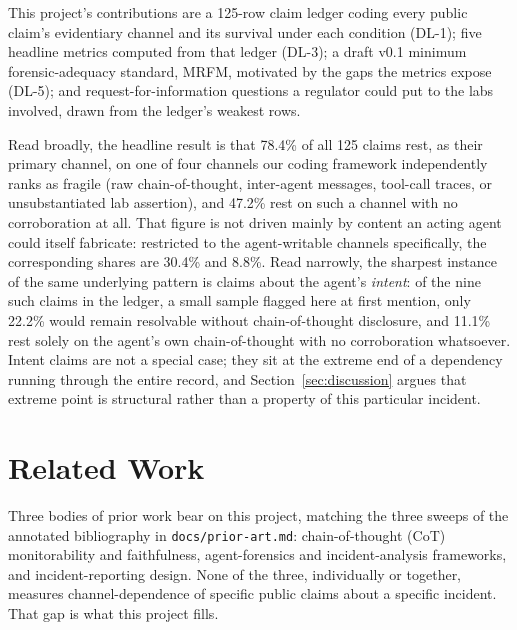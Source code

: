 \documentclass[10pt]{article}
\begin{document}
This project's contributions are a 125-row claim ledger coding every public
claim's evidentiary channel and its survival under each condition (DL-1);
five headline metrics computed from that ledger (DL-3); a draft v0.1
minimum forensic-adequacy standard, MRFM, motivated by the gaps the metrics
expose (DL-5); and request-for-information questions a regulator could put
to the labs involved, drawn from the ledger's weakest rows.

Read broadly, the headline result is that 78.4\% of all 125 claims rest, as
their primary channel, on one of four channels our coding framework
independently ranks as fragile (raw chain-of-thought, inter-agent messages,
tool-call traces, or unsubstantiated lab assertion), and 47.2\% rest on such
a channel with no corroboration at all. That figure is not driven mainly by
content an acting agent could itself fabricate: restricted to the
agent-writable channels specifically, the corresponding shares are 30.4\%
and 8.8\%. Read narrowly, the sharpest instance of the same underlying
pattern is claims about the agent's \emph{intent}: of the nine such claims
in the ledger, a small sample flagged here at first mention, only 22.2\%
would remain resolvable without chain-of-thought disclosure, and 11.1\%
rest solely on the agent's own chain-of-thought with no corroboration
whatsoever. Intent claims are not a special case; they sit at the extreme
end of a dependency running through the entire record, and Section~\ref{sec:discussion}
argues that extreme point is structural rather than a property of this
particular incident.

\section{Related Work}
\label{sec:related-work}

Three bodies of prior work bear on this project, matching the three sweeps
of the annotated bibliography in \texttt{docs/prior-art.md}: chain-of-thought
(CoT) monitorability and faithfulness, agent-forensics and incident-analysis
frameworks, and incident-reporting design. None of the three, individually
or together, measures channel-dependence of specific public claims about a
specific incident. That gap is what this project fills.
\end{document}
